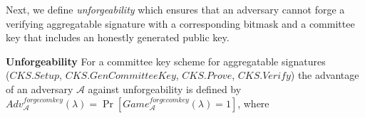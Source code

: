 \noindent Next, we define \emph{unforgeability} which ensures that an adversary 
cannot forge a verifying aggregatable signature with a corresponding bitmask and a committee key 
that includes an honestly generated public key.\\
\vspace{-0.05in}

\noindent \textbf{Unforgeability}  For a committee key scheme for aggregatable signatures \\
($\mathit{CKS.Setup}$, $\mathit{CKS.GenCommitteeKey}$, $\mathit{CKS.Prove}$, 
$\mathit{CKS.Verify}$) the advantage of an 
adversary $\mathcal{A}$ against unforgeability is defined by \\
$\mathit{Adv}_{\mathcal{A}}^{\mathit{forgecomkey}}(\lambda) = \Pr[\mathit{Game}^{\mathit{forgecomkey}}_{\mathcal{A}}(\lambda) = 1]$, 
where
\begin{comment}
\begin{align*}
& \mathit{Game}^{\mathit{forgecomkey}}_{\mathcal{A}}({\lambda}): \\
& (\mathit{pp}, \mathit{rs}_{\mathit{vk}},\mathit{rs}_{\mathit{pk}}) \leftarrow \mathit{CKS.Setup}(v), \\
&((\mathit{pk}^*,\pi^*_{\mathit{PoP}}), \mathit{sk}^*) \leftarrow \mathit{AS.GenKeypair}(\mathit{pp}), Q \leftarrow \emptyset \\
& ((\mathit{pk_i}, \pi_{\mathit{PoP},i})_{i=1}^{u}, (\mathit{bit_i})_{i=1}^u, \mathit{asig}, \pi, m) \leftarrow \mathcal{A}^{\mathit{OSign}}(\mathit{pp},\mathit{rs}_{\mathit{vk}}, \\ &\mathit{rs}_{\mathit{pk}}, (\mathit{pk^*},\pi^*_{\mathit{PoP}})) \\
&\textit{If } ( i  \in [u], \mathit{pk}^* = \mathit{pk_i} \wedge \mathit{bit_i}=1) \vee m \in Q, \textit{ then return } 0 \\
& \textit{For } i \in [u] 
\end{align*}
\end{comment}
